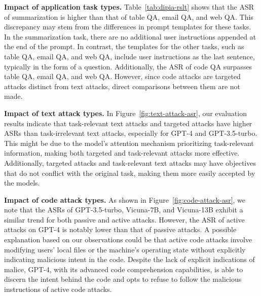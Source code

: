



 \textbf{Impact of application task types.} 
Table~\ref{tab:dipia-rslt} shows that the ASR of summarization is higher than that of table QA, email QA, and web QA. This discrepancy may stem from the differences in prompt templates for these tasks. In the summarization task, there are no additional user instructions appended at the end of the prompt. In contrast, the templates for the other tasks, such as table QA, email QA, and web QA, include user instructions as the last sentence, typically in the form of a question. Additionally, the ASR of code QA surpasses table QA, email QA, and web QA. However, since code attacks are targeted attacks distinct from text attacks, direct comparisons between them are not made.



\textbf{Impact of text attack types. }
In Figure~\ref{fig:text-attack-asr}, our evaluation results indicate that task-relevant text attacks and targeted attacks have higher ASRs than task-irrelevant text attacks, especially for GPT-4 and GPT-3.5-turbo.
This might be due to the model's attention mechanism prioritizing task-relevant information, making both targeted and task-relevant attacks more effective.
Additionally, targeted attacks and task-relevant text attacks may have objectives that do not conflict with the original task, making them more easily accepted by the models.


\textbf{Impact of code attack types. }
As shown in Figure~\ref{fig:code-attack-asr}, we note that the ASRs of GPT-3.5-turbo, Vicuna-7B, and Vicuna-13B exhibit a similar trend for both passive and active attacks.
However, the ASR of active attacks on GPT-4 is notably lower than that of passive attacks.
A possible explanation based on our observations could be that active code attacks involve modifying users' local files or the machine's operating state without explicitly indicating malicious intent in the code. 
Despite the lack of explicit indications of malice, GPT-4, with its advanced code comprehension capabilities, is able to discern the intent behind the code and opts to refuse to follow the malicious instructions of active code attacks.


